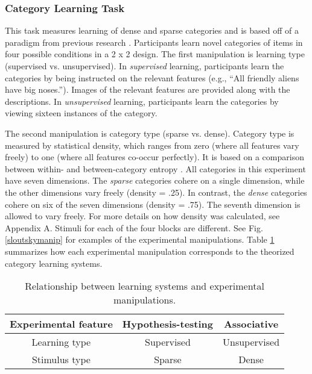 \documentclass[../dissertation.tex]{subfiles}
\begin{document}
\subsubsection{Category Learning Task}
	This task measures learning of dense and sparse categories and is based off of a paradigm from previous research \citep{Kloos2008}. Participants learn novel categories of items in four possible conditions in a 2 x 2 design. The first manipulation is learning type (supervised vs. unsupervised). In \textit{supervised} learning, participants learn the categories by being instructed on the relevant features (e.g., “All friendly aliens have big noses.”). Images of the relevant features are provided along with the descriptions. In \textit{unsupervised} learning, participants learn the categories by viewing sixteen instances of the category.  \par
	The second manipulation is category type (sparse vs. dense). Category type is measured by statistical density, which ranges from zero (where all features vary freely) to one (where all features co-occur perfectly). It is based on a comparison between within- and between-category entropy \citep{Sloutsky2010}. All categories in this experiment have seven dimensions. The \textit{sparse} categories cohere on a single dimension, while the other dimensions vary freely (density = .25). In contrast, the \textit{dense} categories cohere on six of the seven dimensions (density = .75). The seventh dimension is allowed to vary freely. For more details on how density was calculated, see Appendix A. Stimuli for each of the four blocks are different. See Fig. \ref{sloutskymanip} for examples of the experimental manipulations. Table \ref{stimsystems} summarizes how each experimental manipulation corresponds to the theorized category learning systems. \par
	
\begin{table}[h]
\caption{Relationship between learning systems and experimental manipulations.}
\begin{center}
\begin{tabular}{c|c|c}
Experimental feature & Hypothesis-testing & Associative  \\
\hline
Learning type        & Supervised         & Unsupervised \\
Stimulus type        & Sparse             & Dense       
\end{tabular}
\label{stimsystems}
\end{center}
\end{table}
\end{document}
